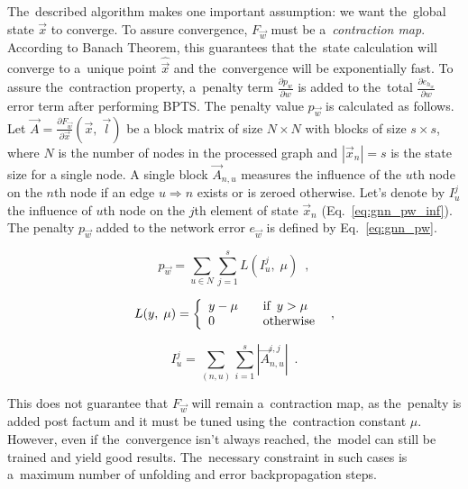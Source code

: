 \documentclass{llncs}
\begin{document}
\noindent The~described algorithm makes one important assumption: we want the~global state $\vec{x}$ to converge. To assure convergence, $F_{\vec{w}}$ must be a~\emph{contraction map}. According to Banach Theorem, this guarantees that the~state calculation will converge to a~unique point $\hat{\vec{x}}$ and the~convergence will be exponentially fast. To assure the~contraction property, a~penalty term $\frac{\partial p_{w}}{\partial w}$ is added to the~total $\frac{\partial e_{h_w}}{\partial w}$ error term after performing BPTS. The penalty value $p_{\vec{w}}$ is calculated as follows.
Let $\vec{A} = \frac{\partial F_{\vec{w}}}{\partial \vec{x}}(\vec{x}, \; \vec{l})$ be a block matrix of size $N \times N$ with blocks of size $s \times s$, where $N$ is the number of nodes in the processed graph and $|\vec{x}_n| = s$ is the state size for a single node. A single block $\vec{A}_{n,u}$ measures the influence of the $u$th node on the $n$th node if an edge $u \Rightarrow n$ exists or is zeroed otherwise. Let's denote by $I_u^j$ the influence of $u$th node on the $j$th element of state $\vec{x}_n$ (Eq.~\ref{eq:gnn_pw_inf}). The penalty $p_{\vec{w}}$ added to the network error $e_{\vec{w}}$ is defined by Eq.~\ref{eq:gnn_pw}.

\begin{equation}
p_{\vec{w}} = \sum_{u \in N} \sum_{j = 1}^{s} L(I_u^j, \; \mu) \enspace ,
\label{eq:gnn_pw}
\end{equation}

\begin{equation}
L(y, \; \mu) = \left\{
\begin{array}{l l}
	y - \mu		& \quad \mbox{if} \enspace y > \mu \\
	0			& \quad \mbox{otherwise}
\end{array} \right. \enspace ,
\label{eq:gnn_pw_L}
\end{equation}

\begin{equation}
I_u^j =  \sum_{(n, u)} \sum_{i = 1}^{s} |\vec{A}_{n, u}^{i, j}| \enspace .
\label{eq:gnn_pw_inf}
\end{equation}


\noindent This does not guarantee that $F_{\vec{w}}$ will remain a~contraction map, as the~penalty is added post factum and it must be tuned using the~contraction constant $\mu$. However, even if the~convergence isn't always reached, the~model can still be trained and yield good results. The~necessary constraint in such cases is a~maximum number of unfolding and error backpropagation steps.
\end{document}
